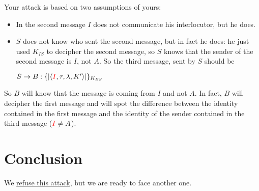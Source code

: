 \documentclass[11pt]{article}
\begin{document}
    Your attack is based on two assumptions of yours:
    \begin{itemize}
        \item In the second message $I$ does not communicate his interlocutor, but he does.
        \item $S$ does not know who sent the second message, but in fact he does: he just used $K_{IS}$ to decipher the
            second message, so $S$ knows that the sender of the second message is $I$, not $A$. So the third message, sent by $S$ should be
            \begin{center} $S \rightarrow B: \{|\langle \textcolor{red}{I}, \tau, \lambda, K' \rangle|\}_{K_{BS}}$ \end{center}


    \end{itemize}
    So $B$ will know that the message is coming from $I$ and not $A$. In fact, $B$ will decipher the first message and will spot
    the difference between the identity contained in the first message and the identity of the sender contained in
    the third message
    ($\textcolor{red}{I} \neq A$).



    \section{Conclusion}
    We \underline{refuse this attack}, but we are ready to face another one.
\end{document}
